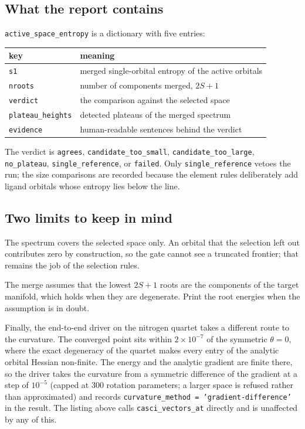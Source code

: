 \subsection{What the report contains}

\texttt{active\_space\_entropy} is a dictionary with five entries:

\begin{center}
\begin{tabular}{ll}
\toprule
key & meaning \\
\midrule
\texttt{s1} & merged single-orbital entropy of the active orbitals \\
\texttt{nroots} & number of components merged, $2S+1$ \\
\texttt{verdict} & the comparison against the selected space \\
\texttt{plateau\_heights} & detected plateaus of the merged spectrum \\
\texttt{evidence} & human-readable sentences behind the verdict \\
\bottomrule
\end{tabular}
\end{center}

The verdict is \texttt{agrees}, \texttt{candidate\_too\_small},
\texttt{candidate\_too\_large}, \texttt{no\_plateau},
\texttt{single\_reference}, or \texttt{failed}.  Only
\texttt{single\_reference} vetoes the run; the size comparisons are
recorded because the element rules deliberately add ligand orbitals
whose entropy lies below the line.

\subsection{Two limits to keep in mind}

The spectrum covers the selected space only.  An orbital that the
selection left out contributes zero by construction, so the gate
cannot see a truncated frontier; that remains the job of the selection
rules.

The merge assumes that the lowest $2S+1$ roots are the components of the
target manifold, which holds when they are degenerate.  Print the root
energies when the assumption is in doubt.

Finally, the end-to-end driver on the nitrogen quartet takes a
different route to the curvature.  The converged point sits within
$2\times10^{-7}$ of the symmetric $\theta=0$, where the exact
degeneracy of the quartet makes every entry of the analytic orbital
Hessian non-finite.  The energy and the analytic gradient are finite
there, so the driver takes the curvature from a symmetric difference of
the gradient at a step of $10^{-5}$ (capped at 300 rotation parameters;
a larger space is refused rather than approximated) and records
\texttt{curvature\_method = 'gradient-difference'} in the result.  The
listing above calls \texttt{casci\_vectors\_at} directly and is
unaffected by any of this.
